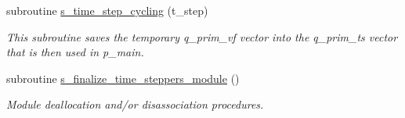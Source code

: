 \begin{DoxyCompactItemize}
subroutine \hyperlink{namespacem__time__steppers_a575aa7f95bf96994f49d81d71d19c192}{s\+\_\+time\+\_\+step\+\_\+cycling} (t\+\_\+step)
\begin{DoxyCompactList}\small\item\em This subroutine saves the temporary q\+\_\+prim\+\_\+vf vector into the q\+\_\+prim\+\_\+ts vector that is then used in p\+\_\+main. \end{DoxyCompactList}\item 
subroutine \hyperlink{namespacem__time__steppers_aa065ccea3fd76bafc98da7cea5d50416}{s\+\_\+finalize\+\_\+time\+\_\+steppers\+\_\+module} ()
\begin{DoxyCompactList}\small\item\em Module deallocation and/or disassociation procedures. \end{DoxyCompactList}\end{DoxyCompactItemize}
